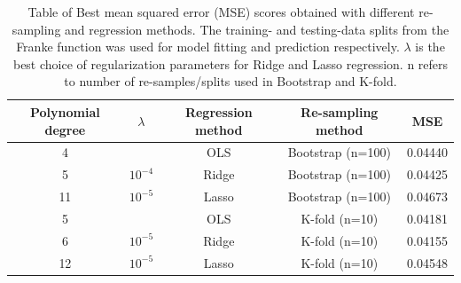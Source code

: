 \begin{table}
    \centering
    \caption{Table of Best mean squared error (MSE) scores obtained with
        different re-sampling and regression
        methods. The training- and testing-data splits from the Franke function
        was used for model fitting and
        prediction respectively. $\lambda $ is the best choice of regularization parameters for
        Ridge and Lasso regression. n refers to number of re-samples/splits used in
        Bootstrap and K-fold.}  
    \label{tab:franke_mse_best} 
    \begin{tabular}{|c|c|c|c|c|}
        \hline
        Polynomial degree & $\lambda$ & Regression method & Re-sampling method & MSE \\
        \hline
                      4    &    & OLS & Bootstrap (n=100) & 0.04440 \\
        \hline
                      5   & $10^{-4}$  & Ridge & Bootstrap (n=100)& 0.04425 \\
        \hline
                      11  & $10^{-5}$  & Lasso & Bootstrap (n=100)& 0.04673 \\
                      
        \hline
                      5    &   & OLS &  K-fold (n=10) &  0.04181\\
        \hline
                      6   &  $10^{-5}$  & Ridge &  K-fold (n=10) & 0.04155 \\
        \hline
                      12  &  $10^{-5}$ & Lasso &  K-fold (n=10) & 0.04548 \\
        \hline
    \end{tabular} 
\end{table}




